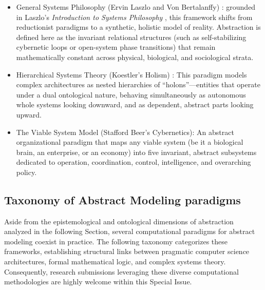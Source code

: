 \documentclass[11pt, a4paper]{article}
\begin{document}
\begin{itemize}
	\item \textrm{General Systems Philosophy (Ervin Laszlo and Von Bertalanffy) \cite{vonbertalanffy1968general}: grounded in Laszlo's \textit{Introduction to Systems Philosophy} \cite{laszlo1972introduction}}, this framework shifts from reductionist paradigms to a synthetic, holistic model of reality. Abstraction is defined here as the invariant relational structures (such as self-stabilizing cybernetic loops or open-system phase transitions) that remain mathematically constant across physical, biological, and sociological strata.
	\item \textrm{Hierarchical Systems Theory (Koestler's Holism) \cite{koestler1967ghost}}: This paradigm models complex architectures as nested hierarchies of ``holons''---entities that operate under a dual ontological nature, behaving simultaneously as autonomous whole systems looking downward, and as dependent, abstract parts looking upward.
	\item \textrm{The Viable System Model (Stafford Beer's Cybernetics): \cite{beer1985diagnosing}} An abstract organizational paradigm that maps any viable system (be it a biological brain, an enterprise, or an economy) into five invariant, abstract subsystems dedicated to operation, coordination, control, intelligence, and overarching policy.
\end{itemize}


\subsection{Taxonomy of Abstract Modeling paradigms} \label{sec:taxo}

Aside from the epistemological and ontological dimensions of abstraction analyzed in the following Section, several computational paradigms for abstract modeling coexist in practice. The following taxonomy categorizes these frameworks, establishing structural links between pragmatic computer science architectures, formal mathematical logic, and complex systems theory. Consequently, research submissions leveraging these diverse computational methodologies are highly welcome within this Special Issue.
\end{document}
